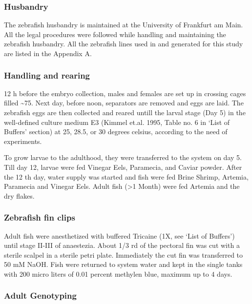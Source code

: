 \documentclass[11pt,singlespacinge,twoside]{reedthesis} %
\begin{document}
\hypertarget{husbandry}{%
\subsubsection{Husbandry}\label{husbandry}}

The zebrafish husbandry is maintained at the University of Frankfurt am Main. All the legal procedures were followed while handling and maintaining the zebrafish husbandry. All the zebrafish lines used in and generated for this study are listed in the Appendix A.

\hypertarget{handling-and-rearing}{%
\subsubsection{Handling and rearing}\label{handling-and-rearing}}

12 h before the embryo collection, males and females are set up in crossing cages filled \textasciitilde{}75. Next day, before noon, separators are removed and eggs are laid. The zebrafish eggs are then collected and reared untill the larval stage (Day 5) in the well-defined culture medium E3 (Kimmel et.al. 1995, Table no. 6 in `List of Buffers' section) at 25, 28.5, or 30 degrees celsius, according to the need of experiments.

To grow larvae to the adulthood, they were transferred to the system on day 5. Till day 12, larvae were fed Vinegar Eels, Paramecia, and Caviar powder. After the 12 th day, water supply was started and fish were fed Brine Shrimp, Artemia, Paramecia and Vinegar Eels. Adult fish (\textgreater{}1 Month) were fed Artemia and the dry flakes.

\hypertarget{zebrafish-fin-clips}{%
\subsubsection{Zebrafish fin clips}\label{zebrafish-fin-clips}}

Adult fish were anesthetized with buffered Tricaine (1X, see `List of Buffers') until stage II-III of anaestezia. About 1/3 rd of the pectoral fin was cut with a sterile scalpel in a sterile petri plate. Immediately the cut fin was transferred to 50 mM NaOH. Fish were returned to system water and kept in the single tanks with 200 micro liters of 0.01 percent methylen blue, maximum up to 4 days.

\hypertarget{adult-genotyping}{%
\subsubsection{Adult Genotyping}\label{adult-genotyping}}
\end{document}
